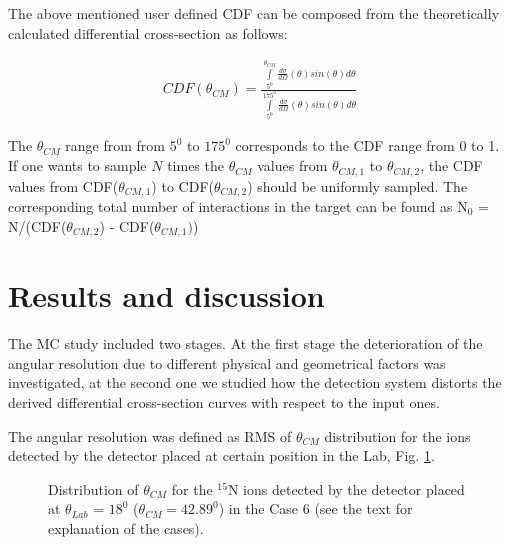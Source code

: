 \documentclass[%
 aip,
cp,  %
 amsmath,amssymb,%
 reprint,%
]{revtex4-2}
\begin{document}
The above mentioned user defined CDF can be composed from the theoretically calculated differential cross-section as follows:

\begin{eqnarray}
 CDF(\theta_{CM}) = \frac{ \int\limits_{5^0}^{\theta_{CM}} \frac{d\sigma}{d\Omega}(\theta) sin(\theta)d\theta } { \int\limits_{5^0}^{175^0} \frac{d\sigma}{d\Omega}(\theta) sin(\theta)d\theta }
\end{eqnarray}

The $\theta_{CM}$ range from from $5 ^0$ to $175 ^0$ corresponds to the CDF range from 0 to 1.  If one wants to sample $N$ times the $\theta_{CM}$ values from $\theta_{CM, 1}$ to $\theta_{CM, 2}$, the CDF values from CDF($\theta_{CM, 1}$) to CDF($\theta_{CM, 2}$) should be uniformly sampled.  The corresponding total  number of interactions in the target can be found as N$_0$ = N/(CDF($\theta_{CM, 2}$) - CDF($\theta_{CM, 1})$)


\section{Results and discussion}

The MC study included two stages. At the first stage the deterioration of the angular resolution due to different physical and geometrical factors  was investigated, at the second one we studied how the detection system distorts the derived differential cross-section curves with respect to the input ones.

The angular resolution was defined as RMS of  $\theta_{CM}$ distribution for the ions detected by the detector placed at certain position in the Lab, Fig. \ref{ris:fig2}.

\begin{figure}[h]
\caption{Distribution of $\theta_{CM}$ for the ${}^{15}$N ions detected by the detector placed at $\theta_{Lab}$ = $18^0$ ($\theta_{CM}=42.89^0$) in the Case 6 (see the text for explanation of the cases).}
\label{ris:fig2}
\end{figure}
\end{document}
